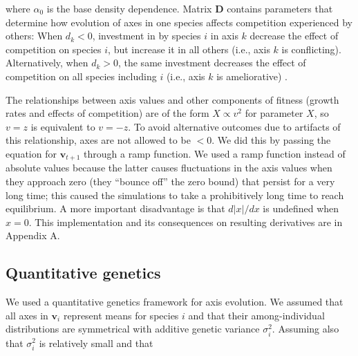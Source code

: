 \noindent where $\alpha_0$ is the base density dependence.
Matrix $\mathbf{D}$ contains parameters that determine how evolution of axes
in one species affects competition experienced by others:
When $d_k < 0$, investment in by species $i$ in axis $k$ decrease the
effect of competition on species $i$, but increase it in all others
(i.e., axis $k$ is conflicting).
Alternatively, when $d_k > 0$, the same investment decreases the effect of
competition on all species including $i$ (i.e., axis $k$ is ameliorative)
\citep{Northfield2013a}.


The relationships between axis values and other components of fitness
(growth rates and effects of competition) are of the form
$X \propto v^2$ for parameter $X$, so $v = z$ is equivalent to $v = -z$.
To avoid alternative outcomes due to artifacts of this relationship,
axes are not allowed to be $< 0$.
We did this by passing the equation for $\mathbf{v}_{t+1}$ through a
ramp function.
We used a ramp function instead of absolute values
because the latter causes fluctuations
in the axis values when they approach zero (they ``bounce off''
the zero bound) that persist for a very long time;
this caused the simulations to take a prohibitively long time to reach
equilibrium.
A more important disadvantage is that $d \lvert x \rvert / dx$ is
undefined when $x = 0$.
This implementation and its consequences on resulting derivatives are in
Appendix A.




%


\subsection*{Quantitative genetics}

We used a quantitative genetics framework for axis evolution.
We assumed that all axes in $\mathbf{v}_i$ represent means for species $i$
and that their among-individual distributions are symmetrical with additive
genetic variance $\sigma^2_i$.
Assuming also that $\sigma^2_i$ is relatively small
\citep{Iwasa1991a,Abrams2001a,Abrams1993b} and that

